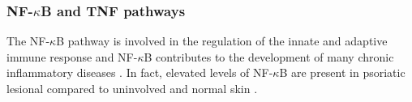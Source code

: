 


\subsubsection*{NF-$\kappa$B and TNF pathways}

The NF-$\kappa$B pathway is involved in the regulation of the innate and adaptive immune response and NF-$\kappa$B contributes to the development of many chronic inflammatory diseases \parencite{Liu2017}. In fact, elevated levels of NF-$\kappa$B are present in psoriatic lesional compared to uninvolved and normal skin \parencite{Lizzul2005}. 

